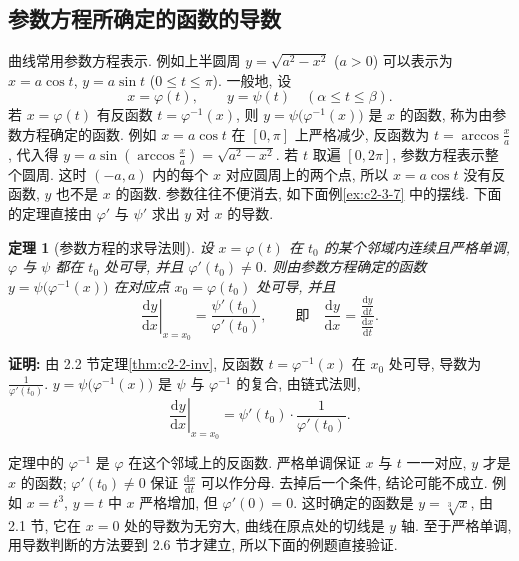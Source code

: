 \documentclass[UTF8,openany]{ctexbook}
\theoremstyle{chinesetextbook}
\newenvironment{cnproof}{\par\indent\textbf{证明:} \ignorespaces}{\par}
\newtheorem*{theoremsingle}{定理}
\newcommand{\dd}{\mathrm d}
\begin{document}
\subsection{参数方程所确定的函数的导数}
曲线常用参数方程表示. 例如上半圆周 $y=\sqrt{a^2-x^2}$ ($a>0$) 可以表示为 $x=a\cos t$, $y=a\sin t$ ($0\le t\le\pi$). 一般地, 设
\[
x=\varphi(t),\qquad y=\psi(t)\quad(\alpha\le t\le\beta).
\]
若 $x=\varphi(t)$ 有反函数 $t=\varphi^{-1}(x)$, 则 $y=\psi\bigl(\varphi^{-1}(x)\bigr)$ 是 $x$ 的函数, 称为由参数方程确定的函数. 例如 $x=a\cos t$ 在 $[0,\pi]$ 上严格减少, 反函数为 $\displaystyle t=\arccos\frac xa$, 代入得 $\displaystyle y=a\sin\left(\arccos\frac xa\right)=\sqrt{a^2-x^2}$. 若 $t$ 取遍 $[0,2\pi]$, 参数方程表示整个圆周. 这时 $(-a,a)$ 内的每个 $x$ 对应圆周上的两个点, 所以 $x=a\cos t$ 没有反函数, $y$ 也不是 $x$ 的函数. 参数往往不便消去, 如下面例\ref{ex:c2-3-7} 中的摆线. 下面的定理直接由 $\varphi'$ 与 $\psi'$ 求出 $y$ 对 $x$ 的导数.
\begin{theoremsingle}[参数方程的求导法则]
设 $x=\varphi(t)$ 在 $t_0$ 的某个邻域内连续且严格单调, $\varphi$ 与 $\psi$ 都在 $t_0$ 处可导, 并且 $\varphi'(t_0)\ne0$. 则由参数方程确定的函数 $y=\psi\bigl(\varphi^{-1}(x)\bigr)$ 在对应点 $x_0=\varphi(t_0)$ 处可导, 并且
\[
\left.\frac{\dd y}{\dd x}\right|_{x=x_0}=\frac{\psi'(t_0)}{\varphi'(t_0)},\qquad\text{即}\quad\frac{\dd y}{\dd x}=\frac{\frac{\dd y}{\dd t}}{\frac{\dd x}{\dd t}}.
\]
\end{theoremsingle}
\begin{cnproof}
由 2.2 节定理\ref{thm:c2-2-inv}, 反函数 $t=\varphi^{-1}(x)$ 在 $x_0$ 处可导, 导数为 $\displaystyle\frac1{\varphi'(t_0)}$. $y=\psi\bigl(\varphi^{-1}(x)\bigr)$ 是 $\psi$ 与 $\varphi^{-1}$ 的复合, 由链式法则,
\[
\left.\frac{\dd y}{\dd x}\right|_{x=x_0}=\psi'(t_0)\cdot\frac1{\varphi'(t_0)}.
\]
\end{cnproof}
定理中的 $\varphi^{-1}$ 是 $\varphi$ 在这个邻域上的反函数. 严格单调保证 $x$ 与 $t$ 一一对应, $y$ 才是 $x$ 的函数; $\varphi'(t_0)\ne0$ 保证 $\displaystyle\frac{\dd x}{\dd t}$ 可以作分母. 去掉后一个条件, 结论可能不成立. 例如 $x=t^3$, $y=t$ 中 $x$ 严格增加, 但 $\varphi'(0)=0$. 这时确定的函数是 $y=\sqrt[3]x$, 由 2.1 节, 它在 $x=0$ 处的导数为无穷大, 曲线在原点处的切线是 $y$ 轴. 至于严格单调, 用导数判断的方法要到 2.6 节才建立, 所以下面的例题直接验证.
\end{document}
